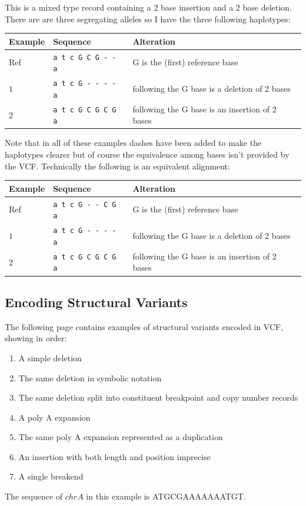 \documentclass[8pt]{article}
\begin{document}
This is a mixed type record containing a 2 base insertion and a 2 base deletion.
There are are three segregating alleles so I have the three following haplotypes:

\vspace{0.3cm}
\begin{tabular}{ | l | l | l | }
\hline
Example & Sequence & Alteration \\ \hline
Ref & \verb|a t c G C G - - a| & G is the (first) reference base \\ \hline
$1$ & \verb|a t c G - - - - a| & following the G base is a deletion of 2 bases \\ \hline
$2$ & \verb|a t c G C G C G a| & following the G base is an insertion of 2 bases \\ \hline
\end{tabular}
\vspace{0.3cm}

Note that in all of these examples dashes have been added to make the haplotypes clearer but of course the equivalence among bases isn't provided by the VCF.
Technically the following is an equivalent alignment:

\vspace{0.3cm}
\begin{tabular}{ | l | l | l | }
\hline
Example & Sequence & Alteration \\ \hline
Ref & \verb|a t c G - - C G a| & G is the (first) reference base \\ \hline
$1$ & \verb|a t c G - - - - a| & following the G base is a deletion of 2 bases \\ \hline
$2$ & \verb|a t c G C G C G a| & following the G base is an insertion of 2 bases \\ \hline
\end{tabular}

\subsection{Encoding Structural Variants}
The following page contains examples of structural variants encoded in VCF, showing in order:
\begin{enumerate}
  \item A simple deletion
  \item The same deletion in symbolic notation
  \item The same deletion split into constituent breakpoint and copy number records
  \item A poly A expansion
  \item The same poly A expansion represented as a duplication
  \item An insertion with both length and position imprecise
  \item A single breakend
\end{enumerate}
The sequence of $chrA$ in this example is ATGCGAAAAAAATGT.
\end{document}
